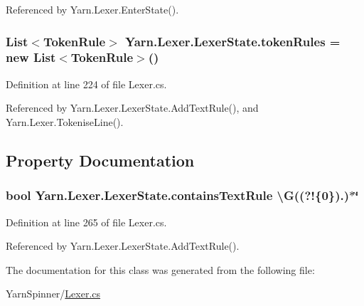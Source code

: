 Referenced by Yarn.\-Lexer.\-Enter\-State().

\hypertarget{a00122_adf6563b1dc6f3ef80ed13c2b15b7be03}{
\subsubsection[{token\-Rules}]{\setlength{\rightskip}{0pt plus 5cm}List$<${\bf Token\-Rule}$>$ Yarn.\-Lexer.\-Lexer\-State.\-token\-Rules = new List$<${\bf Token\-Rule}$>$()}}\label{a00122_adf6563b1dc6f3ef80ed13c2b15b7be03}


Definition at line 224 of file Lexer.\-cs.



Referenced by Yarn.\-Lexer.\-Lexer\-State.\-Add\-Text\-Rule(), and Yarn.\-Lexer.\-Tokenise\-Line().



\subsection{Property Documentation}
\hypertarget{a00122_a69948f05c35eeae9cb8448c849a053e6}{
\subsubsection[{contains\-Text\-Rule}]{\setlength{\rightskip}{0pt plus 5cm}bool Yarn.\-Lexer.\-Lexer\-State.\-contains\-Text\-Rule \textbackslash{}G((?!\{0\}).)$\ast$\char`\"{}\hspace{0.3cm}{\ttfamily [get]}}}\label{a00122_a69948f05c35eeae9cb8448c849a053e6}


Definition at line 265 of file Lexer.\-cs.



Referenced by Yarn.\-Lexer.\-Lexer\-State.\-Add\-Text\-Rule().



The documentation for this class was generated from the following file\-:\begin{DoxyCompactItemize}
\item 
Yarn\-Spinner/\hyperlink{a00298}{Lexer.\-cs}\end{DoxyCompactItemize}
